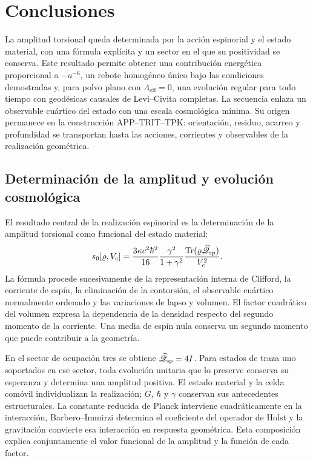 \section{Conclusiones}
\label{vii:sec:conclusiones}

La amplitud torsional queda determinada por la acción espinorial y el
estado material, con una fórmula explícita y un sector en el que su
positividad se conserva. Este resultado permite obtener una contribución
energética proporcional a \(-a^{-6}\), un rebote homogéneo único bajo las
condiciones demostradas y, para polvo plano con
\(\Lambda_{\mathrm{eff}}=0\), una evolución regular para todo tiempo con
geodésicas causales de Levi--Civita completas. La secuencia enlaza un
observable cuártico del estado con una escala cosmológica mínima. Su
origen permanece en la construcción APP--TRIT--TPK: orientación, residuo,
acarreo y profundidad se transportan hasta las acciones, corrientes y
observables de la realización geométrica.

\subsection{Determinación de la amplitud y evolución cosmológica}

El resultado central de la realización espinorial es la determinación
de la amplitud torsional como funcional del estado material:
\[
 s_0[\varrho,V_c]
 =\frac{3\kappa c^2\hbar^2}{16}
   \frac{\gamma^2}{1+\gamma^2}
   \frac{\operatorname{Tr}
    (\varrho\widehat{\mathscr Q}_{\rm sp})}{V_c^2}.
\]
La fórmula procede sucesivamente de la representación interna de
Clifford, la corriente de espín, la eliminación de la contorsión,
el observable cuártico normalmente ordenado y las variaciones de
lapso y volumen. El factor cuadrático del volumen expresa la
dependencia de la densidad respecto del segundo momento de la
corriente. Una media de espín nula conserva un segundo momento
que puede contribuir a la geometría.

En el sector de ocupación tres se obtiene
\(\widehat{\mathscr Q}_{\rm sp}=4I\). Para estados de traza uno
soportados en ese sector, toda evolución unitaria que lo preserve
conserva su esperanza y determina una amplitud positiva.
El estado material y la celda comóvil individualizan la realización;
\(G\), \(\hbar\) y \(\gamma\) conservan sus antecedentes
estructurales. La constante reducida de Planck interviene cuadráticamente en
la interacción, Barbero--Immirzi determina el coeficiente del
operador de Holst y la gravitación convierte esa interacción en
respuesta geométrica. Esta composición explica conjuntamente
el valor funcional de la amplitud y la función de cada factor.


